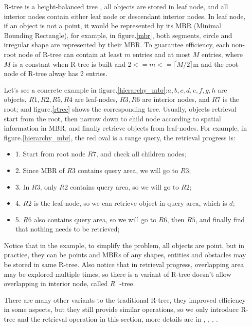 R-tree is a height-balanced tree \cite{guttman1984r}, all objects are stored in leaf node, and all interior nodes
contain either leaf node or descendant interior nodes. In leaf node, if an object is not a
point, it would be represented by its MBR (Minimal Bounding Rectangle),
for example, in figure.\ref{mbr}, both segments,
circle and irregular shape are represented by their MBR\@.
To guarantee efficiency, each non-root node of R-tree can contain at least $m$ entries and at
most $M$ entries, where $M$ is a constant when R-tree is built and $2<=m<=\lceil M/2\rceil$m
and the root node of R-tree alway has 2 entries.

Let's see a concrete example in
figure.\ref{hierarchy_mbr}:\@ $a,b,c,d,e,f,g,h$ are objects, $R1,R2,R5,R4$ are leaf-nodes, $R3,
R6$ are interior nodes, and $R7$ is the root; and figure.\ref{rtree} shows the corresponding
tree. Usually, objects retrieval start from the root, then narrow down to child node according
to spatial information in MBR, and finally retrieve objects from leaf-nodes. For example, in
figure.\ref{hierarchy_mbr}, the red oval is a range query, the retrieval progress is:

\begin{itemize}
  \item 1. Start from root node $R7$, and check all children nodes;
  \item 2. Since MBR of $R3$ contains query area, we will go to $R3$;
  \item 3. In $R3$, only $R2$ contains query area, so we will go to $R2$;
  \item 4. $R2$ is the leaf-node, so we can retrieve object in query area, which is $d$;
  \item 5. $R6$ also contains query area, so we will go to $R6$, then $R5$, and finally find
    that nothing needs to be retrieved;
\end{itemize}

Notice that in the example, to simplify the problem, all objects are point, but in practice,
they can be points and MBRs of any shapes, entities and obstacles may be stored in same R-tree.
Also notice that in retrieval progress, overlapping area may be explored multiple times, so there is a
variant of R-tree doesn't allow overlapping in interior node, called
$R^+$-tree\cite{sellis1987r+}.

There are many other variants to the traditional R-tree, they
improved efficiency in some aspects, but they still provide similar operations, so we only
introduce R-tree and the retrieval operation in this section, more details are in
\cite{guttman1984r}, \cite{beckmann1990r}, \cite{sellis1987r+}, \cite{kamel1993hilbert}.

